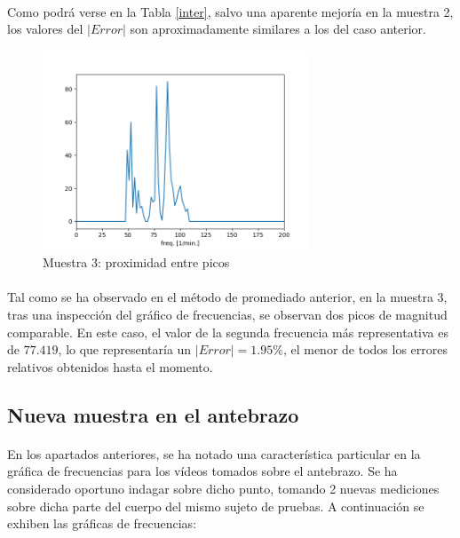 \documentclass[12pt, twocolumn]{article}
\begin{document}
	\paragraph{} Como podrá verse en la Tabla \ref{inter}, salvo una aparente mejoría en la muestra 2, los valores del $|Error|$ son aproximadamente similares a los del caso anterior. 
	
	\begin{figure}[H]
		\centering
		\includegraphics[width=8cm]{sample3-c200_200_5.png}
		\caption{Muestra 3: proximidad entre picos}
		\label{3prox1}
	\end{figure}
	
	\paragraph{} Tal como se ha observado en el método de promediado anterior, en la muestra 3, tras una inspección del gráfico de frecuencias, se observan dos picos de magnitud comparable. En este caso, el valor de la segunda frecuencia más representativa es de $77.419$, lo que representaría un $|Error| = 1.95\%$, el menor de todos los errores relativos obtenidos hasta el momento. 
	
	\subsection{Nueva muestra en el antebrazo}
	
	\paragraph{} En los apartados anteriores, se ha notado una característica particular en la gráfica de frecuencias para los vídeos tomados sobre el antebrazo. Se ha considerado oportuno indagar sobre dicho punto, tomando 2 nuevas mediciones sobre dicha parte del cuerpo del mismo sujeto de pruebas. A continuación se exhiben las gráficas de frecuencias:
	
\end{document}
